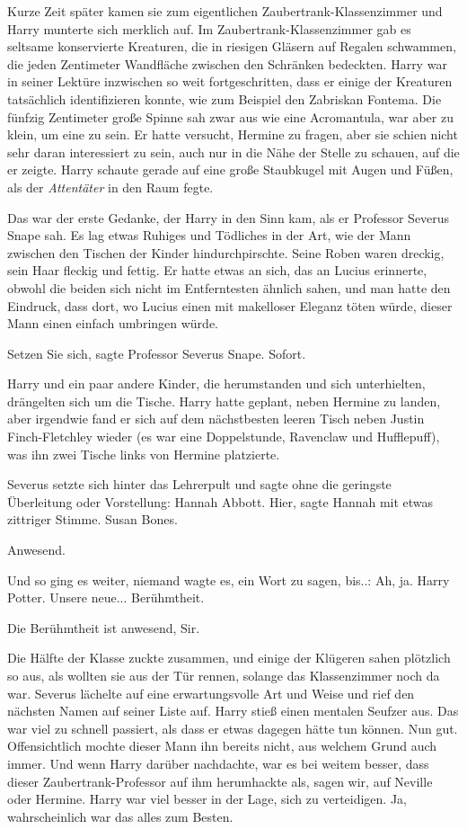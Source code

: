 Kurze Zeit später kamen sie zum eigentlichen Zaubertrank-Klassenzimmer und Harry
munterte sich merklich auf. Im Zaubertrank-Klassenzimmer gab es seltsame
konservierte Kreaturen, die in riesigen Gläsern auf Regalen schwammen, die jeden
Zentimeter Wandfläche zwischen den Schränken bedeckten. Harry war in seiner
Lektüre inzwischen so weit fortgeschritten, dass er einige der Kreaturen
tatsächlich identifizieren konnte, wie zum Beispiel den Zabriskan Fontema. Die
fünfzig Zentimeter große Spinne sah zwar aus wie eine Acromantula, war aber zu
klein, um eine zu sein. Er hatte versucht, Hermine zu fragen, aber sie schien
nicht sehr daran interessiert zu sein, auch nur in die Nähe der Stelle zu
schauen, auf die er zeigte. Harry schaute gerade auf eine große Staubkugel mit
Augen und Füßen, als der \emph{Attentäter} in den Raum fegte.

Das war der erste Gedanke, der Harry in den Sinn kam, als er Professor Severus
Snape sah. Es lag etwas Ruhiges und Tödliches in der Art, wie der Mann zwischen
den Tischen der Kinder hindurchpirschte. Seine Roben waren dreckig, sein Haar
fleckig und fettig. Er hatte etwas an sich, das an Lucius erinnerte, obwohl die
beiden sich nicht im Entferntesten ähnlich sahen, und man hatte den Eindruck,
dass dort, wo Lucius einen mit makelloser Eleganz töten würde, dieser Mann einen
einfach umbringen würde.

\glqq Setzen Sie sich\grqq{}, sagte Professor Severus Snape. \glqq
Sofort.\grqq{}

Harry und ein paar andere Kinder, die herumstanden und sich unterhielten,
drängelten sich um die Tische. Harry hatte geplant, neben Hermine zu landen,
aber irgendwie fand er sich auf dem nächstbesten leeren Tisch neben Justin
Finch-Fletchley wieder (es war eine Doppelstunde, Ravenclaw und Hufflepuff), was
ihn zwei Tische links von Hermine platzierte.

Severus setzte sich hinter das Lehrerpult und sagte ohne die geringste
Überleitung oder Vorstellung: \glqq Hannah Abbott.\grqq{} \glqq Hier\grqq{},
sagte Hannah mit etwas zittriger Stimme. \glqq Susan Bones.\grqq{}

\glqq Anwesend.\grqq{}

Und so ging es weiter, niemand wagte es, ein Wort zu sagen, bis..: \glqq Ah, ja.
Harry Potter. Unsere neue... Berühmtheit.\grqq{}

\glqq Die Berühmtheit ist anwesend, Sir.\grqq{}

Die Hälfte der Klasse zuckte zusammen, und einige der Klügeren sahen plötzlich
so aus, als wollten sie aus der Tür rennen, solange das Klassenzimmer noch da
war. Severus lächelte auf eine erwartungsvolle Art und Weise und rief den
nächsten Namen auf seiner Liste auf. Harry stieß einen mentalen Seufzer aus. Das
war viel zu schnell passiert, als dass er etwas dagegen hätte tun können. Nun
gut. Offensichtlich mochte dieser Mann ihn bereits nicht, aus welchem Grund auch
immer. Und wenn Harry darüber nachdachte, war es bei weitem besser, dass dieser
Zaubertrank-Professor auf ihm herumhackte als, sagen wir, auf Neville oder
Hermine. Harry war viel besser in der Lage, sich zu verteidigen. Ja,
wahrscheinlich war das alles zum Besten.

